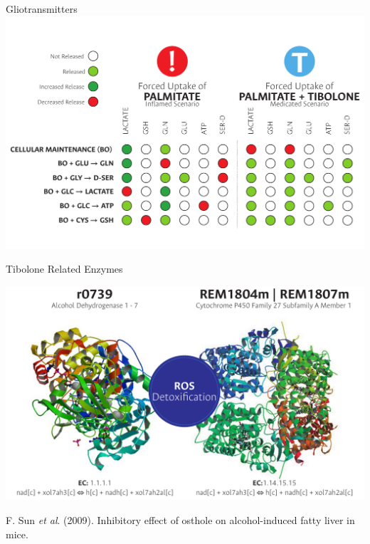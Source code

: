 \documentclass[11pt]{beamer}
\begin{document}
\begin{frame}{Gliotransmitters}
\includegraphics[width=\textwidth]{GTt}
\end{frame}
\begin{frame}{Tibolone Related Enzymes}
\begin{center}
\includegraphics[width=\textwidth]{TiboloneEnzymes}
\end{center}
{\scriptsize F. Sun \textit{et al}. (2009). Inhibitory effect of osthole on alcohol-induced fatty liver in mice.}
\end{frame}
\end{document}
